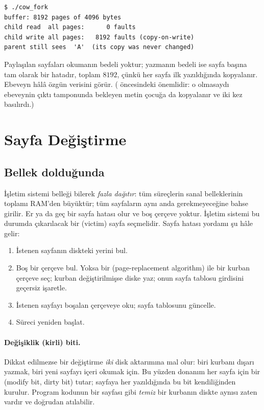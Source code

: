 

\begin{lstlisting}[style=term]
$ ./cow_fork
buffer: 8192 pages of 4096 bytes
child read  all pages:      0 faults
child write all pages:   8192 faults (copy-on-write)
parent still sees  'A'  (its copy was never changed)
\end{lstlisting}

Paylaşılan sayfaları okumanın bedeli yoktur; yazmanın bedeli ise sayfa başına tam olarak bir hatadır, toplam $8192$, çünkü her sayfa ilk yazıldığında kopyalanır. Ebeveyn hâlâ özgün verisini görür. ( öncesindeki  önemlidir: o olmasaydı ebeveynin çıktı tamponunda bekleyen metin çocuğa da kopyalanır ve iki kez basılırdı.)

\section{Sayfa Değiştirme}
\label{sec:repl}

\subsection{Bellek dolduğunda}

İşletim sistemi belleği bilerek \emph{fazla dağıtır}: tüm süreçlerin sanal belleklerinin toplamı RAM'den büyüktür; tüm sayfaların aynı anda gerekmeyeceğine bahse girilir. Er ya da geç bir sayfa hatası olur ve boş çerçeve yoktur. İşletim sistemi bu durumda çıkarılacak bir  (victim) sayfa seçmelidir. Sayfa hatası yordamı şu hâle gelir:

\begin{enumerate}[leftmargin=1.4em]
  \item İstenen sayfanın diskteki yerini bul.
  \item Boş bir çerçeve bul. Yoksa bir  (page-replacement algorithm) ile bir kurban çerçeve seç; kurban değiştirilmişse diske yaz; onun sayfa tablosu girdisini geçersiz işaretle.
  \item İstenen sayfayı boşalan çerçeveye oku; sayfa tablosunu güncelle.
  \item Süreci yeniden başlat.
\end{enumerate}

\paragraph{Değişiklik (kirli) biti.} Dikkat edilmezse bir değiştirme \emph{iki} disk aktarımına mal olur: biri kurbanı dışarı yazmak, biri yeni sayfayı içeri okumak için. Bu yüzden donanım her sayfa için bir  (modify bit, dirty bit) tutar; sayfaya her yazıldığında bu bit kendiliğinden kurulur. Program kodunun bir sayfası gibi \emph{temiz} bir kurbanın diskte aynısı zaten vardır ve doğrudan atılabilir.

